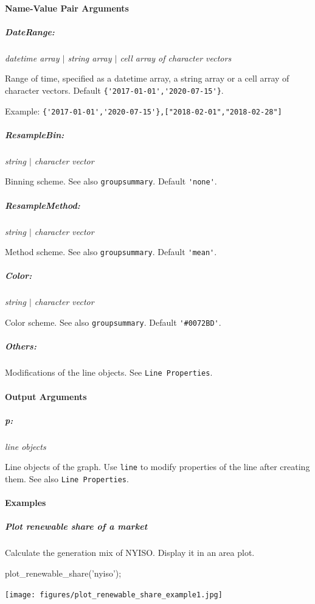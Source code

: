 \documentclass[11pt]{article}
\numberwithin{equation}{section}
\numberwithin{table}{section}
\numberwithin{figure}{section}
\begin{document}
\paragraph{Name-Value Pair Arguments}
\subparagraph{DateRange:} \textit{datetime array $|$ string array $|$ cell array of character vectors}

Range of time, specified as a datetime array, a string array or a cell array of character vectors. Default \verb!{'2017-01-01','2020-07-15'}!.

Example: \verb!{'2017-01-01','2020-07-15'},["2018-02-01","2018-02-28"]!

\subparagraph{ResampleBin:} \textit{string $|$ character vector}

Binning scheme. See also \verb!groupsummary!. Default \verb!'none'!.
\subparagraph{ResampleMethod:} \textit{string $|$ character vector}

Method scheme. See also \verb!groupsummary!. Default \verb!'mean'!.

\subparagraph{Color:} \textit{string $|$ character vector}

Color scheme. See also \verb!groupsummary!. Default \verb!'#0072BD'!.

\subparagraph{Others:}

Modifications of the line objects. See \verb!Line Properties!.



\paragraph{Output Arguments}
\subparagraph{p:} \textit{line objects}

Line objects of the graph. Use \verb!line! to modify properties of the line after creating them. See also \verb!Line Properties!.



\paragraph{Examples}
\subparagraph{Plot renewable share of a market}

Calculate the generation mix of NYISO. Display it in an area plot.

\begin{Code}
  plot_renewable_share('nyiso');
\end{Code}

\begin{center}
  \noindent\texttt{[image: figures/plot\_renewable\_share\_example1.jpg]}
\end{center}
\end{document}
